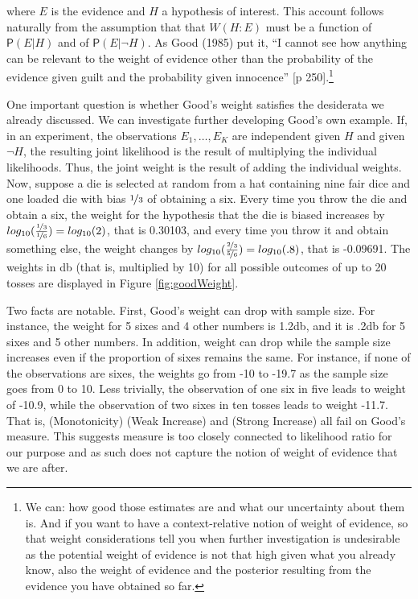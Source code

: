 \documentclass[
  10pt,
  dvipsnames,enabledeprecatedfontcommands]{scrartcl}
\newcommand{\pr}[1]{\mathsf{P}(#1)}
\begin{document}
\noindent where \(E\) is the evidence and \(H\) a hypothesis of
interest. This account follows naturally from the assumption that that
\(W(H:E)\) must be a function of \(\pr{E\vert H}\) and of
\(\pr{E\vert \neg H}\). As Good (1985) put it, ``I cannot see how
anything can be relevant to the weight of evidence other than the
probability of the evidence given guilt and the probability given
innocence'' {[}p
250{]}.\footnote{We can: how good those estimates are and what our uncertainty about them is. And if you want to have a context-relative notion of weight of evidence, so that weight considerations tell you when further investigation is undesirable as the potential weight of evidence is not that high given what you already know, also the weight of evidence and the posterior resulting from   the evidence you have obtained so far.}

One important question is whether Good's weight satisfies the desiderata
we already discussed. We can investigate further developing Good's own
example. If, in an experiment, the observations \(E_1, \dots, E_K\) are
independent given \(H\) and given \(\neg H\), the resulting joint
likelihood is the result of multiplying the individual likelihoods.
Thus, the joint weight is the result of adding the individual weights.
Now, suppose a die is selected at random from a hat containing nine fair
dice and one loaded die with bias \(\nicefrac{1}{3}\) of obtaining a
six. Every time you throw the die and obtain a six, the weight for the
hypothesis that the die is biased increases by
\(log_{10}(\frac{\nicefrac{1}{3}}{\nicefrac{1}{6}})= log_{10}(2)\), that
is 0.30103, and every time you throw it and obtain something else, the
weight changes by
\(log_{10}(\frac{\nicefrac{2}{3}}{\nicefrac{5}{6}})= log_{10}(.8)\),
that is -0.09691. The weights in db (that is, multiplied by 10) for all
possible outcomes of up to 20 tosses are displayed in Figure
\ref{fig:goodWeight}.

Two facts are notable. First, Good's weight can drop with sample size.
For instance, the weight for 5 sixes and 4 other numbers is 1.2db, and
it is .2db for 5 sixes and 5 other numbers. In addition, weight can drop
while the sample size increases even if the proportion of sixes remains
the same. For instance, if none of the observations are sixes, the
weights go from -10 to -19.7 as the sample size goes from 0 to 10. Less
trivially, the observation of one six in five leads to weight of -10.9,
while the observation of two sixes in ten tosses leads to weight -11.7.
That is, (Monotonicity) (Weak Increase) and (Strong Increase) all fail
on Good's measure. This suggests measure is too closely connected to
likelihood ratio for our purpose and as such does not capture the notion
of weight of evidence that we are after.
\end{document}
